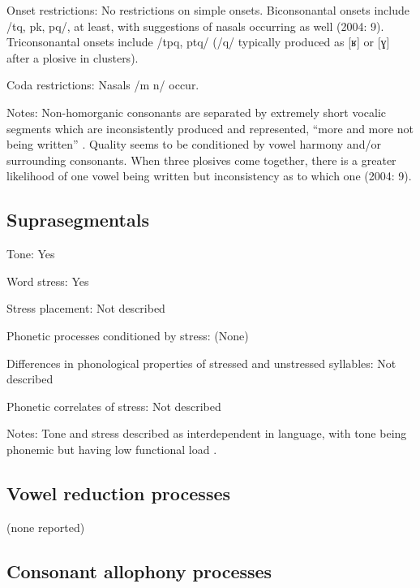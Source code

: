 {\begin{appendixdesc}
\item[Onset restrictions:] No restrictions on simple onsets. Biconsonantal onsets include /tq, pk, pq/, at least, with suggestions of nasals occurring as well (2004: 9). Triconsonantal onsets include /tpq, ptq/ (/q/ typically produced as [ʁ] or [ɣ] after a plosive in clusters). 

\item[Coda restrictions:] Nasals /m n/ occur.

\item[Notes:] Non-homorganic consonants are separated by extremely short vocalic segments which are inconsistently produced and represented, “more and more not being written” \citep[226]{Whitehead2004}. Quality seems to be conditioned by vowel harmony and/or surrounding consonants. When three plosives come together, there is a greater likelihood of one vowel being written but inconsistency as to which one (2004: 9).
\end{appendixdesc}
\subsection*{Suprasegmentals}
\begin{appendixdesc}
\item[Tone:] Yes

\item[Word stress:] Yes

\item[Stress placement:] Not described

\item[Phonetic processes conditioned by stress:] (None)

\item[Differences in phonological properties of stressed and unstressed syllables:] Not described

\item[Phonetic correlates of stress:] Not described

\item[Notes:] Tone and stress described as interdependent in language, with tone being phonemic but having low functional load \citep[226]{Whitehead2004}. 
\end{appendixdesc}
\subsection*{Vowel reduction processes}

(none reported)
\subsection*{Consonant allophony processes}
\begin{appendixdesc}


\end{appendixdesc}}
